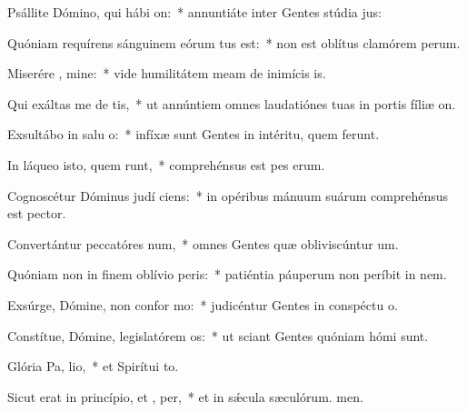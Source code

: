 \item Psállite Dómino, qui hábi  on:~* annuntiáte inter Gentes stúdia jus:
\item Quóniam requírens sánguinem eórum tus est:~* non est oblítus clamórem perum.
\item Miserére , mine:~* vide humilitátem meam de inimícis is.
\item Qui exáltas me de  tis,~* ut annúntiem omnes laudatiónes tuas in portis fíliæ on.
\item Exsultábo in salu o:~* infíxæ sunt Gentes in intéritu, quem ferunt.
\item In láqueo isto, quem runt,~* comprehénsus est pes erum.
\item Cognoscétur Dóminus judí ciens:~* in opéribus mánuum suárum comprehénsus est pector.
\item Convertántur peccatóres  num,~* omnes Gentes quæ obliviscúntur um.
\item Quóniam non in finem oblívio  peris:~* patiéntia páuperum non períbit in nem.
\item Exsúrge, Dómine, non confor mo:~* judicéntur Gentes in conspéctu o.
\item Constítue, Dómine, legislatórem  os:~* ut sciant Gentes quóniam hómi sunt.
\item Glória Pa,  lio,~* et Spirítui to.
\item Sicut erat in princípio, et ,  per,~* et in sǽcula sæculórum. men.
